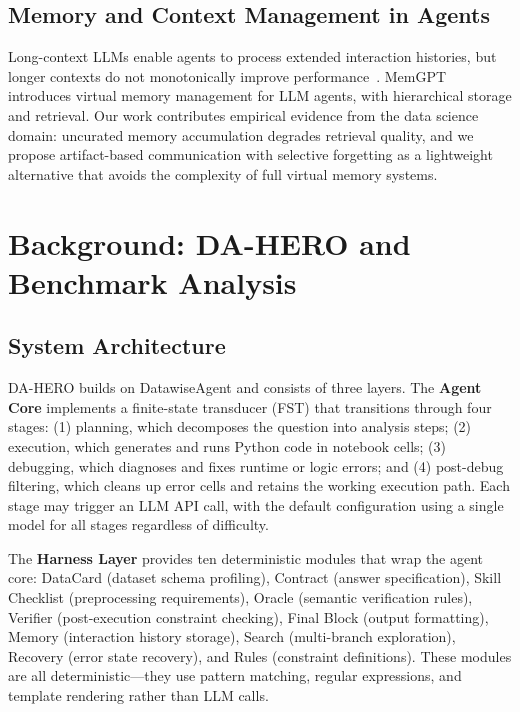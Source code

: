 \documentclass[letterpaper]{article} %
\begin{document}
\subsection{Memory and Context Management in Agents}

Long-context LLMs enable agents to process extended interaction histories, but longer contexts do not monotonically improve performance~\cite{liu2024lost}. MemGPT~\cite{packer2023memgpt} introduces virtual memory management for LLM agents, with hierarchical storage and retrieval. Our work contributes empirical evidence from the data science domain: uncurated memory accumulation degrades retrieval quality, and we propose artifact-based communication with selective forgetting as a lightweight alternative that avoids the complexity of full virtual memory systems.

\section{Background: DA-HERO and Benchmark Analysis}
\label{sec:background}

\subsection{System Architecture}

DA-HERO builds on DatawiseAgent and consists of three layers. The \textbf{Agent Core} implements a finite-state transducer (FST) that transitions through four stages: (1) planning, which decomposes the question into analysis steps; (2) execution, which generates and runs Python code in notebook cells; (3) debugging, which diagnoses and fixes runtime or logic errors; and (4) post-debug filtering, which cleans up error cells and retains the working execution path. Each stage may trigger an LLM API call, with the default configuration using a single model for all stages regardless of difficulty.

The \textbf{Harness Layer} provides ten deterministic modules that wrap the agent core: DataCard (dataset schema profiling), Contract (answer specification), Skill Checklist (preprocessing requirements), Oracle (semantic verification rules), Verifier (post-execution constraint checking), Final Block (output formatting), Memory (interaction history storage), Search (multi-branch exploration), Recovery (error state recovery), and Rules (constraint definitions). These modules are all deterministic---they use pattern matching, regular expressions, and template rendering rather than LLM calls.
\end{document}
